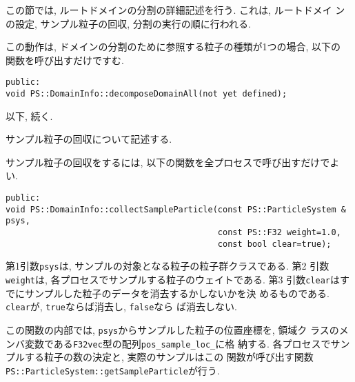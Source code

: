 
この節では, ルートドメインの分割の詳細記述を行う. これは, ルートドメイ
ンの設定, サンプル粒子の回収, 分割の実行の順に行われる.

この動作は, ドメインの分割のために参照する粒子の種類が1つの場合, 以下の
関数を呼び出すだけですむ.
\begin{screen}
\begin{verbatim}
public:
void PS::DomainInfo::decomposeDomainAll(not yet defined);
\end{verbatim}
\end{screen}

以下, 続く.




サンプル粒子の回収について記述する. 

サンプル粒子の回収をするには, 以下の関数を全プロセスで呼び出すだけでよ
い.
\begin{screen}
\begin{verbatim}
public:
void PS::DomainInfo::collectSampleParticle(const PS::ParticleSystem & psys,
                                           const PS::F32 weight=1.0,
                                           const bool clear=true);
\end{verbatim}
\end{screen}

第1引数{\tt psys}は, サンプルの対象となる粒子の粒子群クラスである. 第2
引数{\tt weight}は, 各プロセスでサンプルする粒子のウェイトである. 第3
引数{\tt clear}はすでにサンプルした粒子のデータを消去するかしないかを決
めるものである. {\tt clear}が, {\tt true}ならば消去し, {\tt false}なら
ば消去しない.

この関数の内部では, {\tt psys}からサンプルした粒子の位置座標を, 領域ク
ラスのメンバ変数である{\tt F32vec}型の配列{\tt pos\_sample\_loc\_}に格
納する. 各プロセスでサンプルする粒子の数の決定と, 実際のサンプルはこの
関数が呼び出す関数{\tt PS::ParticleSystem::getSampleParticle}が行う.

